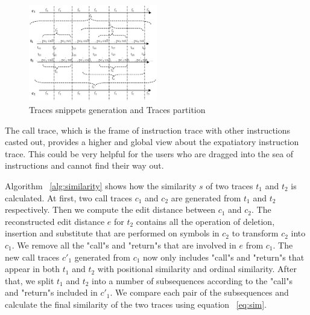 \documentclass[10pt,journal,cspaper,compsoc]{IEEEtran}
\begin{document}
\begin{figure}
\centering
\includegraphics[width=0.5\textwidth]{fig/call1.eps}
\caption{Traces snippets generation and Traces partition }
\label{fig:calltrace}       %
\end{figure}

The call trace, which is the frame of instruction trace with other
instructions casted out, provides a higher and global view about the
expatiatory instruction trace. This could be very helpful for the
users who are dragged into the sea of instructions and cannot find
their way out.

Algorithm ~\ref{alg:similarity} shows how the similarity $s$ of two
traces $t_1$ and $t_2$ is calculated. At first, two call traces
$c_1$ and $c_2$ are generated from $t_1$ and $t_2$ respectively.
Then we compute the edit distance between $c_1$ and $c_2$. The
reconstructed edit distance $e$ for $t_2$ contains all the operation
of deletion, insertion and substitute that are performed on symbols
in $c_2$ to transform $c_2$ into $c_1$. We remove all the "call"s
and "return"s that are involved in $e$ from $c_1$. The new call
traces $c'_1$ generated from $c_1$ now only includes "call"s and
"return"s that appear in both $t_1$ and $t_2$ with positional
similarity and ordinal similarity. After that, we split $t_1$ and
$t_2$ into a number of subsequences according to the "call"s and
"return"s included in $c'_1$. We compare each pair of the
subsequences and calculate the final similarity of the two traces
using equation ~\ref{eq:sim}.
\end{document}
